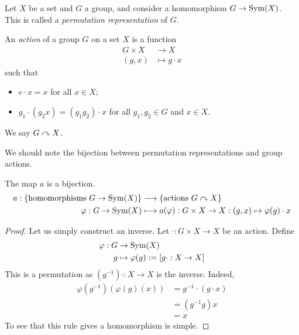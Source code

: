 \documentclass{../../template/note}
\begin{document}
    Let $X$ be a set and $G$ a group, and consider a homomorphism $G \to \operatorname{Sym}(X)$. This is called a \emph{permutation representation} of $G$.

    \begin{definition}
        An \emph{action} of a group $G$ on a set $X$ is a function
        \begin{align*}
            G \times X &\to X \\
            (g, x) &\mapsto g \cdot x
        \end{align*}
        such that
        \begin{itemize}
            \item $e \cdot x = x$ for all $x \in X$;
            \item $g_1 \cdot (g_2 x) = (g_1g_2) \cdot x$ for all $g_1, g_2 \in G$ and $x \in X$.
        \end{itemize}
        We say $G \curvearrowright X$.
    \end{definition}
    
    We should note the bijection between permutation representations and group actions.

    \begin{proposition}
        The map $a$ is a bijection.
        \begin{align*}
        a: \{\text{homomorphisms } G \to \operatorname{Sym}(X)\} &\longrightarrow \{\text{actions } G \curvearrowright X\} \\
        \varphi: G \to \operatorname{Sym}(X) &\longmapsto a(\varphi): G \times X \to X: (g, x) \mapsto \varphi(g) \cdot x
    \end{align*}
    \end{proposition}
    
    \begin{proof}
        Let us simply construct an inverse. Let $\cdot: G \times X \to X$ be an action. Define
        \begin{align*}
            \varphi: G &\to \operatorname{Sym}(X) \\
            g &\mapsto \varphi(g) := [g \cdot: X \to X]
        \end{align*}
        This is a permutation as $(g^{-1}) \cdot: X \to X$ is the inverse. Indeed,
        \begin{align*}
            \varphi(g^{-1})(\varphi(g)(x)) &= g^{-1} \cdot (g \cdot x) \\
            &= (g^{-1}g)x \\
            &= x
        \end{align*}
        To see that this rule gives a homomorphism is simple.
    \end{proof}
    
\end{document}
